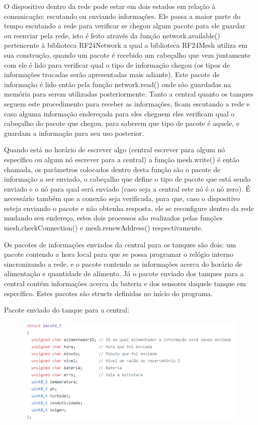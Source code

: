 O dispositivo dentro da rede pode estar em dois estados em relação à comunicação: escutando ou enviando informações. Ele passa a maior parte do tempo escutando a rede para verificar se chegou algum pacote para ele guardar ou reenviar pela rede, isto é feito através da função network.available() pertencente à biblioteca RF24Network a qual a biblioteca RF24Mesh utiliza em sua construção, quando um pacote é recebido um cabeçalho que vem juntamente com ele é lido para verificar qual o tipo de informação chegou (os tipos de informações trocadas serão apresentadas mais adiante). Este pacote de informação é lido então pela função network.read() onde são guardadas na memória para serem utilizadas posteriormente. Tanto a central quanto os tanques seguem este procedimento para receber as informações, ficam escutando a rede e caso alguma informação endereçada para eles cheguem eles verificam qual o cabeçalho do pacote que chegou, para saberem que tipo de pacote é aquele, e guardam a informação para seu uso posterior.

Quando está no horário de escrever algo (central escrever para algum nó específico ou algum nó escrever para a central) a função mesh.write() é então chamada, os parâmetros colocados dentro desta função são o pacote de informação a ser enviado, o cabeçalho que define o tipo de pacote que está sendo enviado e o nó para qual será enviado (caso seja a central este nó é o nó zero). É necessário também que a conexão seja verificada, para que, caso o dispositivo esteja enviando o pacote e não obtenha resposta, ele se reconfigure dentro da rede mudando seu endereço, estes dois processos são realizados pelas funções mesh.checkConnection() e mesh.renewAddress() respectivamente.

Os pacotes de informações enviados da central para os tanques são dois: um pacote contendo a hora local para que se possa programar o relógio interno sincronizando a rede, e o pacote contendo as informações acerca do horário de alimentação e quantidade de alimento. Já o pacote enviado dos tanques para a central contém informações acerca da bateria e dos sensores daquele tanque em específico. Estes pacotes são structs definidas no início do programa.

Pacote enviado do tanque para a central:

\begin{figure}[h]
\centering \includegraphics[keepaspectratio=true,scale=0.7]{figuras/pacote_t}
\label{pacote_t}
\end{figure}


